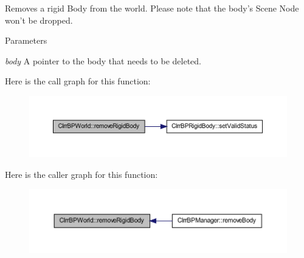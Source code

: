 \label{class_c_irr_b_p_world_a7133c6b9763ac425ac579cdfbda8788b}
Removes a rigid Body from the world. Please note that the body's Scene Node won't be dropped. 
\begin{DoxyParams}{Parameters}
\item[{\em body}]A pointer to the body that needs to be deleted. \end{DoxyParams}


Here is the call graph for this function:\nopagebreak
\begin{figure}[H]
\begin{center}
\leavevmode
\includegraphics[width=400pt]{class_c_irr_b_p_world_a7133c6b9763ac425ac579cdfbda8788b_cgraph}
\end{center}
\end{figure}




Here is the caller graph for this function:\nopagebreak
\begin{figure}[H]
\begin{center}
\leavevmode
\includegraphics[width=400pt]{class_c_irr_b_p_world_a7133c6b9763ac425ac579cdfbda8788b_icgraph}
\end{center}
\end{figure}


